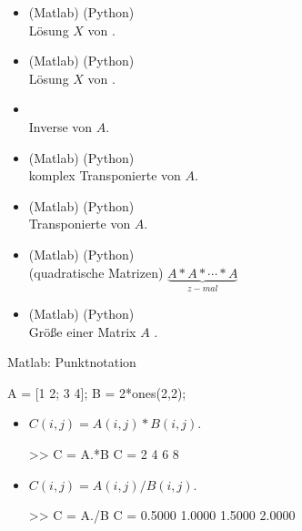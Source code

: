 \documentclass[hyperref={xetex}]{beamer}
\begin{document}
\begin{frame}[fragile]{}
\begin{itemize}
\item {}(Matlab) (Python)\\ Lösung $X$ von . \\

\item {}(Matlab) (Python)\\ Lösung $X$ von .\\

\item {}\\ Inverse von $A$.\\

\item {}(Matlab) (Python)\\ komplex Transponierte von $A$. \\

\item {}(Matlab) (Python)\\ Transponierte von $A$. \\

\item {}(Matlab) (Python)\\ (quadratische Matrizen) $\underbrace{A*A*\cdots *A}_{z-mal}$ \\

\item {}(Matlab) (Python)\\ Gr\"o{\ss}e einer Matrix $A$ . 
\end{itemize}
\end{frame}
%
%
\begin{frame}[fragile]{Matlab: Punktnotation}
\begin{matlabin}
A = [1 2; 3 4]; B = 2*ones(2,2);
\end{matlabin}
\begin{itemize}
\item $C(i,j)=A(i,j)*B(i,j)$.
\begin{matlabin}
>> C = A.*B
C =
     2     4
     6     8
\end{matlabin}
\item $C(i,j)=A(i,j)/B(i,j)$.
\begin{matlabin}
>> C = A./B
C =
    0.5000    1.0000
    1.5000    2.0000
\end{matlabin}
\end{itemize}
\end{frame}
\end{document}
